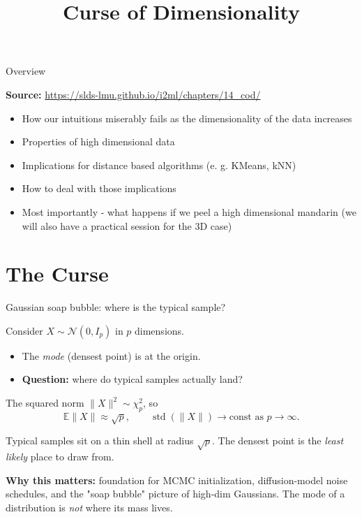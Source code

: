\documentclass{beamer}
\title{Curse of Dimensionality}
\begin{document}

\begin{frame}{Overview}

\textbf{Source: } \url{https://slds-lmu.github.io/i2ml/chapters/14_cod/}

\begin{itemize}
    \item How our intuitions miserably fails as the dimensionality of the data increases
    \item Properties of high dimensional data
    \item Implications for distance based algorithms (e. g. KMeans, kNN)
    \item How to deal with those implications
    \item Most importantly - what happens if we peel a high dimensional mandarin (we will also have a practical session for the 3D case)
\end{itemize}
\end{frame}


\section{The Curse}


\begin{frame}{Gaussian soap bubble: where is the typical sample?}

Consider $X \sim \mathcal{N}(0, I_p)$ in $p$ dimensions.

\begin{itemize}
    \item The \emph{mode} (densest point) is at the origin.
    \item \textbf{Question:} where do typical samples actually land?
\end{itemize}

\pause

\vspace{0.5em}
The squared norm $\|X\|^2 \sim \chi^2_p$, so
\[
    \mathbb{E}\|X\| \approx \sqrt{p}, \qquad \operatorname{std}(\|X\|) \to \text{const as } p \to \infty.
\]

Typical samples sit on a thin shell at radius $\sqrt{p}$. The densest point is the \emph{least likely} place to draw from.

\vspace{0.5em}
\textbf{Why this matters:} foundation for MCMC initialization, diffusion-model noise schedules, and the "soap bubble" picture of high-dim Gaussians. The mode of a distribution is \emph{not} where its mass lives.

\end{frame}
\end{document}
